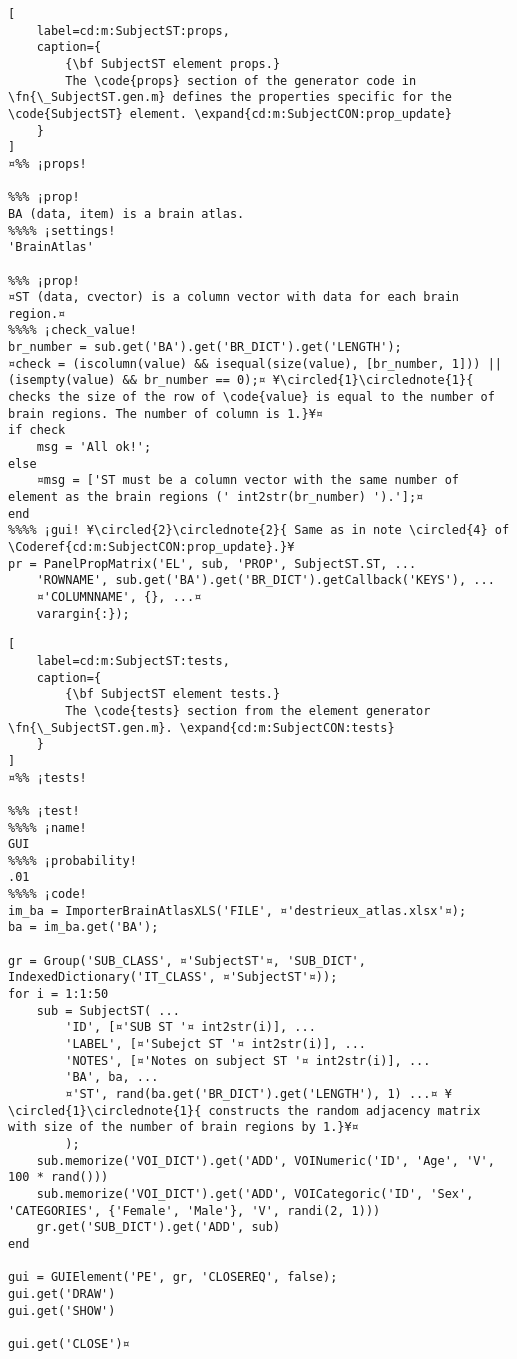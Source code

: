 \documentclass{tufte-handout}
\begin{document}
\begin{lstlisting}[
	label=cd:m:SubjectST:props,
	caption={
		{\bf SubjectST element props.}
		The \code{props} section of the generator code in \fn{\_SubjectST.gen.m} defines the properties specific for the \code{SubjectST} element. \expand{cd:m:SubjectCON:prop_update}
	}
]
¤%% ¡props!

%%% ¡prop!
BA (data, item) is a brain atlas.
%%%% ¡settings!
'BrainAtlas'

%%% ¡prop!
¤ST (data, cvector) is a column vector with data for each brain region.¤
%%%% ¡check_value!
br_number = sub.get('BA').get('BR_DICT').get('LENGTH');
¤check = (iscolumn(value) && isequal(size(value), [br_number, 1])) || (isempty(value) && br_number == 0);¤ ¥\circled{1}\circlednote{1}{ checks the size of the row of \code{value} is equal to the number of brain regions. The number of column is 1.}¥¤
if check
    msg = 'All ok!';
else   
    ¤msg = ['ST must be a column vector with the same number of element as the brain regions (' int2str(br_number) ').'];¤
end
%%%% ¡gui! ¥\circled{2}\circlednote{2}{ Same as in note \circled{4} of \Coderef{cd:m:SubjectCON:prop_update}.}¥
pr = PanelPropMatrix('EL', sub, 'PROP', SubjectST.ST, ...
    'ROWNAME', sub.get('BA').get('BR_DICT').getCallback('KEYS'), ...
    ¤'COLUMNNAME', {}, ...¤
    varargin{:});
\end{lstlisting}

\begin{lstlisting}[
	label=cd:m:SubjectST:tests,
	caption={
		{\bf SubjectST element tests.}
		The \code{tests} section from the element generator \fn{\_SubjectST.gen.m}. \expand{cd:m:SubjectCON:tests}
	}
]
¤%% ¡tests!

%%% ¡test!
%%%% ¡name!
GUI
%%%% ¡probability!
.01
%%%% ¡code!
im_ba = ImporterBrainAtlasXLS('FILE', ¤'destrieux_atlas.xlsx'¤);
ba = im_ba.get('BA');

gr = Group('SUB_CLASS', ¤'SubjectST'¤, 'SUB_DICT', IndexedDictionary('IT_CLASS', ¤'SubjectST'¤));
for i = 1:1:50
    sub = SubjectST( ...
        'ID', [¤'SUB ST '¤ int2str(i)], ...
        'LABEL', [¤'Subejct ST '¤ int2str(i)], ...
        'NOTES', [¤'Notes on subject ST '¤ int2str(i)], ...
        'BA', ba, ...
        ¤'ST', rand(ba.get('BR_DICT').get('LENGTH'), 1) ...¤ ¥\circled{1}\circlednote{1}{ constructs the random adjacency matrix with size of the number of brain regions by 1.}¥¤
        );
    sub.memorize('VOI_DICT').get('ADD', VOINumeric('ID', 'Age', 'V', 100 * rand()))
    sub.memorize('VOI_DICT').get('ADD', VOICategoric('ID', 'Sex', 'CATEGORIES', {'Female', 'Male'}, 'V', randi(2, 1)))
    gr.get('SUB_DICT').get('ADD', sub)
end

gui = GUIElement('PE', gr, 'CLOSEREQ', false);
gui.get('DRAW')
gui.get('SHOW')

gui.get('CLOSE')¤
\end{lstlisting}
\end{document}
